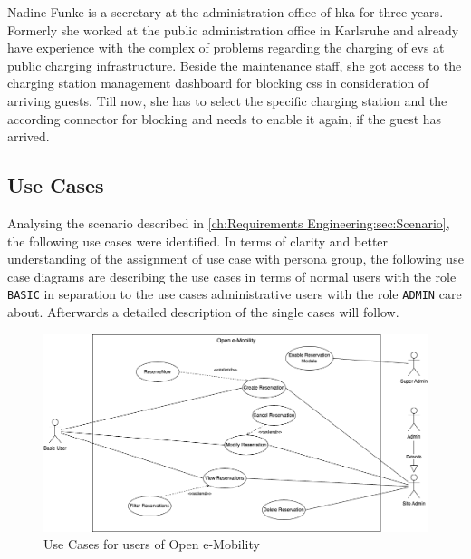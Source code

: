 Nadine Funke is a secretary at the administration office of \acrshort{hka} for three years. Formerly she worked at the public administration office in Karlsruhe and already have experience with the complex of problems regarding the charging of \acrshort{ev}s at public charging infrastructure. Beside the maintenance staff, she got access to the charging station management dashboard for blocking \acrshort{cs}s in consideration of arriving guests. Till now, she has to select the specific charging station and the according connector for blocking and needs to enable it again, if the guest has arrived. 

\subsection{Use Cases}
\label{ch:Requirements Engineering:sec:Use Cases}

Analysing the scenario described in \ref{ch:Requirements Engineering:sec:Scenario}, the following use cases were identified. In terms of clarity and better understanding of the assignment of use case with persona group, the following use case diagrams are describing the use cases in terms of normal users with the role \verb|BASIC| in separation to the use cases administrative users with the role \verb|ADMIN| care about. Afterwards a detailed description of the single cases will follow.

\begin{figure}[h!]
    \centering
    \includegraphics[scale=0.4]{resources/images/main/2_requirements/UseCases.png}
    \caption{Use Cases for users of Open e-Mobility}
    \label{fig:uc_basic_users}
\end{figure}

